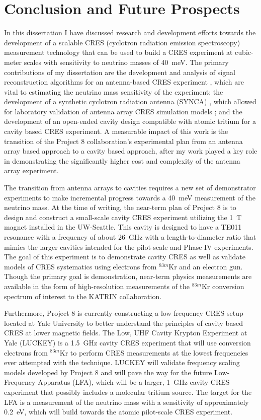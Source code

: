 
\chapter{Conclusion and Future Prospects}

In this dissertation I have discussed research and development efforts towards the development of a scalable CRES (cyclotron radiation emission spectroscopy) measurement technology that can be used to build a CRES experiment at cubic-meter scales with sensitivity to neutrino masses of 40~meV. The primary contributions of my dissertation are the development and analysis of signal reconstruction algorithms for an antenna-based CRES experiment \cite{p8phase3trigger}, which are vital to estimating the neutrino mass sensitivity of the experiment; the development of a synthetic cyclotron radiation antenna (SYNCA) \cite{p8synca}, which allowed for laboratory validation of antenna array CRES simulation models \cite{p8jugaad}; and the development of an open-ended cavity design compatible with atomic tritium for a cavity based CRES experiment. A measurable impact of this work is the transition of the Project 8 collaboration's experimental plan from an antenna array based approach to a cavity based approach, after my work played a key role in demonstrating the significantly higher cost and complexity of the antenna array experiment.

The transition from antenna arrays to cavities requires a new set of demonstrator experiments to make incremental progress towards a 40~meV measurement of the neutrino mass. At the time of writing, the near-term plan of Project 8 is to design and construct a small-scale cavity CRES experiment utilizing the 1~T magnet installed in the UW-Seattle. This cavity is designed to have a TE011 resonance with a frequency of about 26~GHz with a length-to-diameter ratio that mimics the larger cavities intended for the pilot-scale and Phase IV experiments. The goal of this experiment is to demonstrate cavity CRES as well as validate models of CRES systematics using electrons from $^{83m}$Kr and an electron gun. Though the primary goal is demonstration, near-term physics measurements are available in the form of high-resolution measurements of the $^{83m}$Kr conversion spectrum of interest to the KATRIN collaboration.

Furthermore, Project 8 is currently constructing a low-frequency CRES setup located at Yale University to better understand the principles of cavity based CRES at lower magnetic fields. The Low, UHF Cavity Krypton Experiment at Yale (LUCKEY) is a 1.5~GHz cavity CRES experiment that will use conversion electrons from $^{83m}$Kr to perform CRES measurements at the lowest frequencies ever attempted with the technique. LUCKEY will validate frequency scaling models developed by Project 8 and will pave the way for the future Low-Frequency Apparatus (LFA), which will be a larger, 1~GHz cavity CRES experiment that possibly includes a molecular tritium source. The target for the LFA is a measurement of the neutrino mass with a sensitivity of approximately 0.2~eV, which will build towards the atomic pilot-scale CRES experiment.

